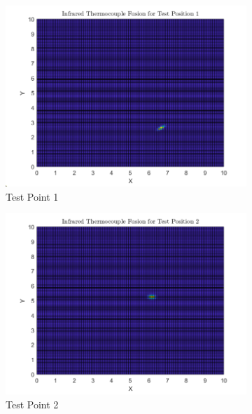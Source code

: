 \documentclass[12pt]{article}
\begin{document}
\begin{figure}[H]
    \centering
    \begin{subfigure}[h]{0.45\textwidth}
        \includegraphics[width=\textwidth]{images/IR_TempFusionA1.png}
        \caption{Test Point 1}
        \label{fig:Fus-1}
    \end{subfigure}
    \begin{subfigure}[h]{0.45\textwidth}
        \includegraphics[width=\textwidth]{images/IR_TempFusionA2.png}
        \caption{Test Point 2}
        \label{fig:Fus-2}
    \end{subfigure}
    \begin{subfigure}[h]{0.45\textwidth}

\end{subfigure}
\end{figure}
\end{document}
